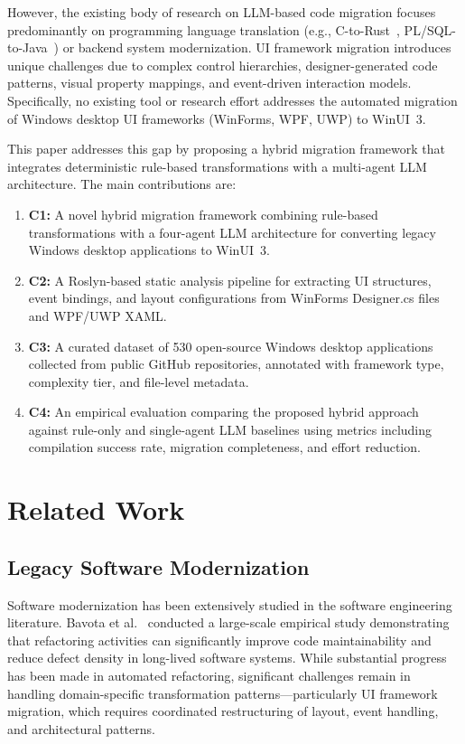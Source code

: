 \documentclass[conference]{IEEEtran}
\begin{document}
However, the existing body of research on LLM-based code migration focuses predominantly on programming language translation (e.g., C-to-Rust~\cite{luo2025,hong2025}, PL/SQL-to-Java~\cite{moti2026}) or backend system modernization. UI framework migration introduces unique challenges due to complex control hierarchies, designer-generated code patterns, visual property mappings, and event-driven interaction models. Specifically, no existing tool or research effort addresses the automated migration of Windows desktop UI frameworks (WinForms, WPF, UWP) to WinUI~3.

This paper addresses this gap by proposing a hybrid migration framework that integrates deterministic rule-based transformations with a multi-agent LLM architecture. The main contributions are:

\begin{enumerate}
    \item \textbf{C1:} A novel hybrid migration framework combining rule-based transformations with a four-agent LLM architecture for converting legacy Windows desktop applications to WinUI~3.
    \item \textbf{C2:} A Roslyn-based static analysis pipeline for extracting UI structures, event bindings, and layout configurations from WinForms Designer.cs files and WPF/UWP XAML.
    \item \textbf{C3:} A curated dataset of 530 open-source Windows desktop applications collected from public GitHub repositories, annotated with framework type, complexity tier, and file-level metadata.
    \item \textbf{C4:} An empirical evaluation comparing the proposed hybrid approach against rule-only and single-agent LLM baselines using metrics including compilation success rate, migration completeness, and effort reduction.
\end{enumerate}

\section{Related Work}

\subsection{Legacy Software Modernization}

Software modernization has been extensively studied in the software engineering literature. Bavota et al.~\cite{bavota2014} conducted a large-scale empirical study demonstrating that refactoring activities can significantly improve code maintainability and reduce defect density in long-lived software systems. While substantial progress has been made in automated refactoring, significant challenges remain in handling domain-specific transformation patterns---particularly UI framework migration, which requires coordinated restructuring of layout, event handling, and architectural patterns.
\end{document}
